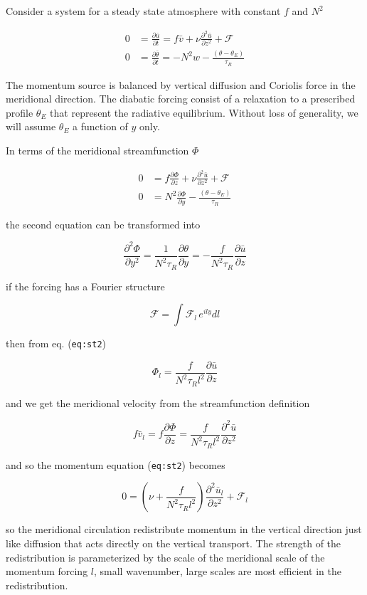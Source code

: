 Consider a system for a steady state atmosphere with constant \(f\) and
\(N^2\)

\[\begin{aligned}
0& = \frac{\partial \bar{u}}{\partial t} = f\bar{v}+ \nu \frac{\partial^{2} \bar{u}}{\partial z^{2}} + \mathcal{F}\\
0& = \frac{\partial \bar{\theta}}{\partial t} = -N^2 w - \frac{(\theta -\theta_E) }{\tau_R}
\end{aligned}\]

The momentum source is balanced by vertical diffusion and Coriolis force
in the meridional direction. The diabatic forcing consist of a
relaxation to a prescribed profile \(\theta_E\) that represent the
radiative equilibrium. Without loss of generality, we will assume
\(\theta_E\) a function of \(y\) only.

In terms of the meridional streamfunction \(\Phi\)

\[
\begin{aligned}
0& =  f \frac{\partial \Phi}{\partial z} + \nu \frac{\partial^{2} \bar{u}}{\partial z^{2}} + \mathcal{F}\\
0& =  N^2 \frac{\partial \Phi}{\partial y} - \frac{(\theta -\theta_E) }{\tau_R}
\end{aligned}
\]

the second equation can be transformed into

\[
\frac{\partial^{2} \Phi}{\partial y^{2}} = \frac{1}{N^2 \tau_R}\frac{\partial \theta}{\partial y} = -\frac{f}{N^2 \tau_R}\frac{\partial \bar{u}}{\partial z}
\]

if the forcing has a Fourier structure

\[\mathcal{F}= \int \mathcal{F}_l \,e^{i l y} dl\]

then from eq. (\texttt{eq:st2})

\[\Phi_l = \frac{f}{N^2 \tau_R l^2} \frac{\partial \bar{u}}{\partial z}\]

and we get the meridional velocity from the streamfunction definition

\[
f \bar{v}_l = f \frac{\partial \Phi}{\partial z} =  \frac{f}{N^2 \tau_R l^2} \frac{\partial^{2} \bar{u}}{\partial z^{2}}\]

and so the momentum equation (\texttt{eq:st2}) becomes

\[0 = \left( \nu + \frac{f}{N^2 \tau_R l^2}\right) \frac{\partial^{2} \bar{u}_l}{\partial z^{2}} + \mathcal{F}_l
\]

so the meridional circulation redistribute momentum in the vertical
direction just like diffusion that acts directly on the vertical
transport. The strength of the redistribution is parameterized by the
scale of the meridional scale of the momentum forcing \(l\), small
wavenumber, large scales are most efficient in the redistribution.
